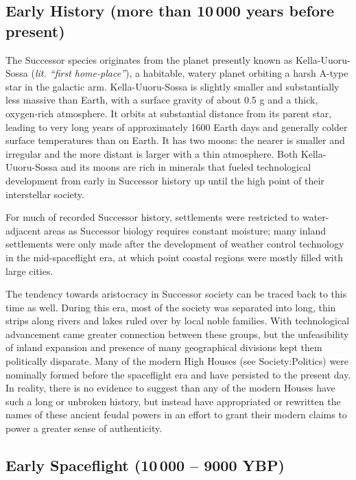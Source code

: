 \documentclass[11pt]{report}
\begin{document}
    \subsection{Early History (more than 10\,000 years before present)}
    The Successor species originates from the planet presently known as Kella-Uuoru-Sossa (\emph{lit. ``first home-place''}), a habitable, watery planet orbiting a harsh A-type star in the galactic arm. Kella-Uuoru-Sossa is slightly smaller and substantially less massive than Earth, with a surface gravity of about 0.5 g and a thick, oxygen-rich atmosphere. It orbits at substantial distance from its parent star, leading to very long years of approximately 1600 Earth days and generally colder surface temperatures than on Earth. It has two moons: the nearer is smaller and irregular and the more distant is larger with a thin atmosphere. Both Kella-Uuoru-Sossa and its moons are rich in minerals that fueled technological development from early in Successor history up until the high point of their interstellar society.
    
    For much of recorded Successor history, settlements were restricted to water-adjacent areas as Successor biology requires constant moisture; many inland settlements were only made after the development of weather control technology in the mid-spaceflight era, at which point coastal regions were mostly filled with large cities.

    The tendency towards aristocracy in Successor society can be traced back to this time as well. During this era, most of the society was separated into long, thin strips along rivers and lakes ruled over by local noble families. With technological advancement came greater connection between these groups, but the unfeasibility of inland expansion and presence of many geographical divisions kept them politically disparate. Many of the modern High Houses (see Society:Politics) were nominally formed before the spaceflight era and have persisted to the present day. In reality, there is no evidence to suggest than any of the modern Houses have such a long or unbroken history, but instead have appropriated or rewritten the names of these ancient feudal powers in an effort to grant their modern claims to power a greater sense of authenticity. 

    \subsection{Early Spaceflight (10\,000 -- 9000 YBP)}
\end{document}

